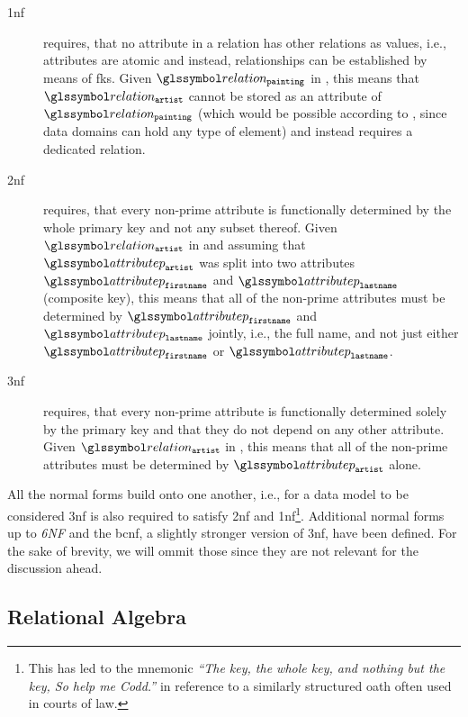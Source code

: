 \begin{description}
    \item[\acrfull{1nf}] requires, that no attribute in a relation has other relations as values, i.e., attributes are atomic and instead, relationships can be established by means of \acrshort{fk}s. Given $\relation_{\mathtt{painting}}$ in , this means that $\relation_{\mathtt{artist}}$ cannot be stored as an attribute of $\relation_{\mathtt{painting}}$ (which would be possible according to , since data domains can hold any type of element) and instead requires a dedicated relation.
    \item[\acrfull{2nf}] requires, that every non-prime attribute is functionally determined by the whole primary key and not any subset thereof. Given $\relation_{\mathtt{artist}}$ in  and assuming that  $\attributep_{\mathtt{artist}}$ was split into two attributes $\attributep_{\mathtt{firstname}}$ and $\attributep_{\mathtt{lastname}}$ (composite key), this means that all of the non-prime attributes must be determined by $\attributep_{\mathtt{firstname}}$ and $\attributep_{\mathtt{lastname}}$ jointly, i.e., the full name, and not just either $\attributep_{\mathtt{firstname}}$ or $\attributep_{\mathtt{lastname}}$.
    \item[\acrfull{3nf}] requires, that every non-prime attribute is functionally determined solely by the primary key and that they do not depend on any other attribute. Given $\relation_{\mathtt{artist}}$ in , this means that all of the non-prime attributes must be determined by $\attributep_{\mathtt{artist}}$ alone.
\end{description}

All the normal forms build onto one another, i.e., for a data model to be considered \acrshort{3nf} is also required to satisfy \acrshort{2nf}  and \acrshort{1nf}\footnote{This has led to the mnemonic \emph{``The key, the whole key, and nothing but the key, So help me Codd.''} in reference to a similarly structured oath often used in courts of law.}. Additional normal forms up to \emph{6NF} and the \acrfull{bcnf}, a slightly stronger version of \acrshort{3nf}, have been defined. For the sake of brevity, we will ommit those since they are not relevant for the discussion ahead.

\subsection{Relational Algebra}
\label{section:rel_algebra}

